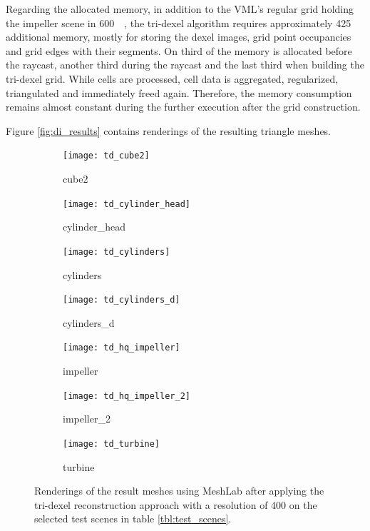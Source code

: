 Regarding the allocated memory, in addition to the VML's regular grid holding the impeller scene in \SI{600}{\mebi\byte}, the tri-dexel algorithm requires approximately \SI{425}{\mebi\byte} additional memory, mostly for storing the dexel images, grid point occupancies and grid edges with their segments.
On third of the memory is allocated before the raycast, another third during the raycast and the last third when building the tri-dexel grid.
While cells are processed, cell data is aggregated, regularized, triangulated and immediately freed again.
Therefore, the memory consumption remains almost constant during the further execution after the grid construction.

Figure \ref{fig:di_results} contains renderings of the resulting triangle meshes.
%
\begin{figure}
	\centering
	\begin{subfigure}[b]{0.34\textwidth}
		\centering
		\texttt{[image: td\_cube2]}
		\caption{cube2}
		\label{fig:td_cube2}
	\end{subfigure}
	\hspace{1cm}
	\begin{subfigure}[b]{0.34\textwidth}
		\centering
		\texttt{[image: td\_cylinder\_head]}
		\caption{cylinder\_head}
		\label{fig:td_cylinder_head}
	\end{subfigure}
	\begin{subfigure}[b]{0.34\textwidth}
		\centering
		\texttt{[image: td\_cylinders]}
		\caption{cylinders}
		\label{fig:td_cylinders}
	\end{subfigure}
	\hspace{1cm}
	\begin{subfigure}[b]{0.34\textwidth}
		\centering
		\texttt{[image: td\_cylinders\_d]}
		\caption{cylinders\_d}
		\label{fig:td_cylinders_delaunay}
	\end{subfigure}
	\begin{subfigure}[b]{0.34\textwidth}
		\centering
		\texttt{[image: td\_hq\_impeller]}
		\caption{impeller}
		\label{fig:td_hq_impeller}
	\end{subfigure}
	\hspace{1cm}
	\begin{subfigure}[b]{0.34\textwidth}
		\centering
		\texttt{[image: td\_hq\_impeller\_2]}
		\caption{impeller\_2}
		\label{fig:td_hq_impeller_2}
	\end{subfigure}
	\begin{subfigure}[b]{0.33\textwidth}
		\centering
		\texttt{[image: td\_turbine]}
		\caption{turbine}
		\label{fig:td_turbine}
	\end{subfigure}
	\caption{
		Renderings of the result meshes using MeshLab after applying the tri-dexel reconstruction approach with a resolution of 400 on the selected test scenes in table \ref{tbl:test_scenes}.
	}
	\label{fig:td_results}
\end{figure}
